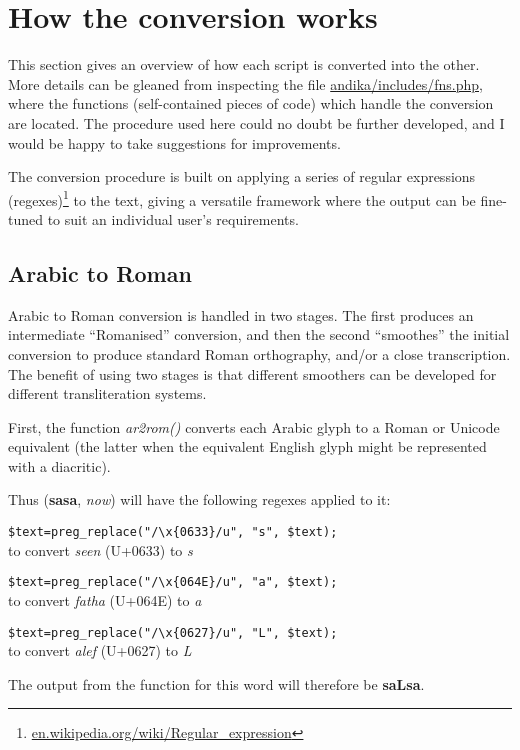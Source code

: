 \section{How the conversion works}

This section gives an overview of how each script is converted into the other.  More details can be gleaned from inspecting the file \url{andika/includes/fns.php}, where the functions (self-contained pieces of code) which handle the conversion are located.  The procedure used here could no doubt be further developed, and I would be happy to take suggestions for improvements.

The conversion procedure  is built on applying a series of regular expressions (regexes)\footnote{\url{en.wikipedia.org/wiki/Regular_expression}} to the text, giving a versatile framework where the output can be fine-tuned to suit an individual user's requirements.

\subsection{Arabic to Roman}

Arabic to Roman conversion is handled in two stages.  The first produces an intermediate ``Romanised'' conversion, and then the second ``smoothes'' the initial conversion to produce standard Roman orthography, and/or a close transcription.  The benefit of using two stages is that different smoothers can be developed for different transliteration systems.

First, the function \textit{ar2rom()} converts each Arabic glyph to a Roman or Unicode equivalent (the latter when the equivalent English glyph might be represented with a diacritic).

Thus  (\textbf{sasa}, \textit{now}) will have the following regexes applied to it:

\verb|$text=preg_replace("/\x{0633}/u", "s", $text);|\\
to convert \textit{seen} (U+0633) to \textit{s}

\verb|$text=preg_replace("/\x{064E}/u", "a", $text);|\\
to convert \textit{fatha} (U+064E) to \textit{a}

\verb|$text=preg_replace("/\x{0627}/u", "L", $text);|\\
to convert \textit{alef} (U+0627) to \textit{L}

The output from the function for this word will therefore be \textbf{saLsa}.


